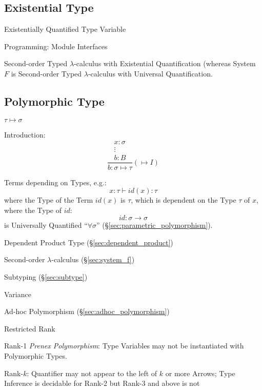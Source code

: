 \subsection{Existential Type}\label{sec:existential_type}

Existentially Quantified Type Variable

Programming: Module Interfaces

Second-order Typed $\lambda$-calculus with Existential Quantification
(whereas System $F$ is Second-order Typed $\lambda$-calculus with
Universal Quantification.



\subsection{Polymorphic Type}\label{sec:polymorphic_type}

$\tau \mapsto \sigma$

Introduction:
\[
  {
  \frac{
    \begin{matrix}
      x : \sigma \\
      \vdots \\
      b : B
    \end{matrix}
  }
  {b : \sigma \mapsto \tau}
  }(\mapsto I)
\]

Terms depending on Types, e.g.:
\[
  x:\tau \vdash id(x):\tau
\]
where the Type of the Term $id(x)$ is $\tau$, which is dependent on
the Type $\tau$ of $x$, where the Type of $id$:
\[
  id:\sigma \rightarrow \sigma
\]
is Universally Quantified ``$\forall \sigma$''
(\S\ref{sec:parametric_polymorphism}).

Dependent Product Type (\S\ref{sec:dependent_product})

Second-order $\lambda$-calculus (\S\ref{sec:system_f})

Subtyping (\S\ref{sec:subtype})

Variance

Ad-hoc Polymorphism (\S\ref{sec:adhoc_polymorphism})

Restricted Rank

Rank-1 \emph{Prenex Polymorphism}: Type Variables may not be
instantiated with Polymorphic Types.

Rank-$k$: Quantifier may not appear to the left of $k$ or more Arrows;
Type Inference is decidable for Rank-2 but Rank-3 and above is not

